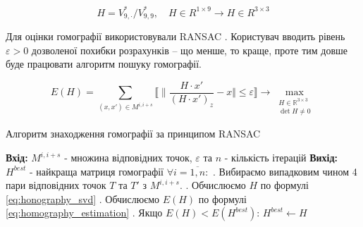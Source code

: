 \begin{equation}
    H = V^{*}_{9,\cdot }/V^{*}_{9,9},\quad H \in R^{1 \times 9} \rightarrow H \in R^{3 \times 3}
    \label{eq:honography_svd}
\end{equation}


Для оцінки гомографії використовували RANSAC \cite{Fischler1981RandomSC}. 
Користувач вводить рівень \(\varepsilon > 0\)
дозволеної похибки розрахунків -- що менше, то краще, проте тим довше
буде працювати алгоритм пошуку гомографії.

\begin{equation}
    E(H) = \sum_{(x,x') \in M^{i,i+s}} 
    \llbracket \| 
    \frac{H\cdot x'}{(H\cdot x')_z} - x
    \Vert \leq \varepsilon
    \rrbracket
    \to \max\limits_{\substack{H \in \mathbb{R}^{3 \times 3} \\ \det{H} \neq 0}}
    \label{eq:homography_estimation}
\end{equation}

\begin{algorithm}[H]
    \caption{Алгоритм знаходження гомографії за принципом RANSAC}
    \begin{algorithmic}
    \State \textbf{Вхід:} $M^{i,i+s}$ - множина відповідних точок, $\varepsilon$ та $n$ - кількість ітерацій
    \State \textbf{Вихід:} $H^{best}$ - найкраща матриця гомографії
    \State $\forall i = \overline{1,n}:$
    \State {}. Вибираємо випадковим чином 4 пари відповідних точок $T$ та $T'$ з $M^{i,i+s}$.
    \State {}. Обчислюємо $H$ по формулі \ref{eq:honography_svd}
    \State {}. Обчислюємо $E(H)$ по формулі \ref{eq:homography_estimation}
    \State {}. Якщо  $E(H) < E(H^{best})$:
    \State \quad \quad $H^{best} \gets H$
    \end{algorithmic}
\end{algorithm}